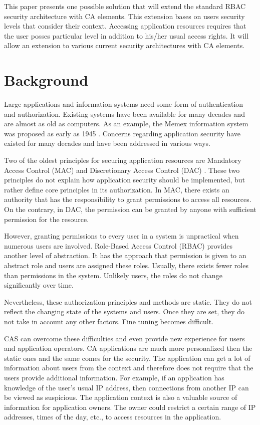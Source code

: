\documentclass{sig-alternate}
\begin{document}
This paper presents  one possible solution that will extend the standard RBAC security architecture with CA elements. This extension bases on users security levels that consider their context. Accessing application resources requires that the user posses particular level in addition to his/her usual access rights. It will allow an extension to various current security architectures with CA elements.

\section{Background}
Large applications and information systems need some form of authentication and authorization. Existing systems have been available for many decades and are almost as old as computers. As an example, the Memex information system was proposed as early as 1945 \cite{memex}. Concerns regarding application security have existed for many decades and have been addressed in various ways.

Two of the oldest principles for securing application resources are Mandatory Access Control (MAC) \cite{accesscontrol} and Discretionary Access Control (DAC) \cite{accesscontrol}. These two principles do not explain how application security should be implemented, but rather define core principles in its authorization. In MAC, there exists an authority that has the responsibility to grant permissions to access all resources. On the contrary, in DAC, the permission can be granted by anyone with sufficient permission for the resource.

However, granting permissions to every user in a system is unpractical when numerous users are involved. Role-Based Access Control (RBAC) \cite{rbac} provides another level of abstraction. It has the approach that permission is given to an abstract role and users are assigned these roles. Usually, there exists fewer roles than permissions in the system. Unlikely users, the roles do not change significantly over time.

Nevertheless, these authorization principles and methods are static. They do not reflect the changing state of the systems and users. Once they are set, they do not take in account any other factors. Fine tuning becomes difficult.

CAS can overcome these difficulties and even provide new experience for users and application operators. CA applications are much more personalized then the static ones and the same comes for the security. The application can get a lot of information about users from the context and therefore does not require that the users provide additional information. For example, if an application has knowledge of the user's usual IP address, then connections from another IP can be viewed as suspicious. The application context is also a valuable source of information for application owners. The owner could restrict a certain range of IP addresses, times of the day, etc., to access resources in the application. 
\end{document}
